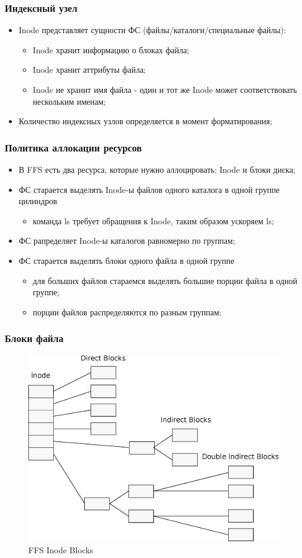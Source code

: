 \begin{frame}
\frametitle{Индексный узел}
\begin{itemize}
  \item Inode представляет сущности ФС (файлы/каталоги/специальные файлы):
    \begin{itemize}
      \item Inode хранит информацию о блоках файла;
      \item Inode хранит аттрибуты файла;
      \item Inode не хранит имя файла - один и тот же Inode может соответствовать нескольким именам;
    \end{itemize}
  \item Количество индексных узлов определяется в момент форматирования;
\end{itemize}
\end{frame}

\begin{frame}
\frametitle{Политика аллокации ресурсов}
\begin{itemize}
  \item В FFS есть два ресурса, которые нужно аллоцировать: Inode и блоки диска;
  \item ФС старается выделять Inode-ы файлов одного каталога в одной группе цилиндров
    \begin{itemize}
      \item команда ls требует обращения к Inode, таким образом ускоряем ls;
    \end{itemize}
  \item ФС рапределяет Inode-ы каталогов равномерно по группам;
  \item ФС старается выделять блоки одного файла в одной группе
    \begin{itemize}
      \item для больших файлов стараемся выделять большие порции файла в одной группе;
      \item порции файлов распределяются по разным группам;
    \end{itemize}
\end{itemize}
\end{frame}

\begin{frame}
\frametitle{Блоки файла}
\begin{figure}
  \centering\includegraphics[width=.6\linewidth]{ffs-inode}
  \caption{FFS Inode Blocks}
\end{figure}
\end{frame}

